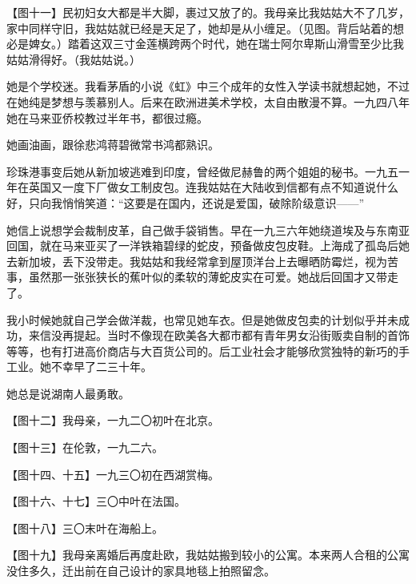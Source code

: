 \par 【图十一】民初妇女大都是半大脚，裹过又放了的。我母亲比我姑姑大不了几岁，家中同样守旧，我姑姑就已经是天足了，她却是从小缠足。（见图。背后站着的想必是婢女。）踏着这双三寸金莲横跨两个时代，她在瑞士阿尔卑斯山滑雪至少比我姑姑滑得好。（我姑姑说。）
\par 她是个学校迷。我看茅盾的小说《虹》中三个成年的女性入学读书就想起她，不过在她纯是梦想与羡慕别人。后来在欧洲进美术学校，太自由散漫不算。一九四八年她在马来亚侨校教过半年书，都很过瘾。
\par 她画油画，跟徐悲鸿蒋碧微常书鸿都熟识。
\par 珍珠港事变后她从新加坡逃难到印度，曾经做尼赫鲁的两个姐姐的秘书。一九五一年在英国又一度下厂做女工制皮包。连我姑姑在大陆收到信都有点不知道说什么好，只向我悄悄笑道：“这要是在国内，还说是爱国，破除阶级意识——”
\par 她信上说想学会裁制皮革，自己做手袋销售。早在一九三六年她绕道埃及与东南亚回国，就在马来亚买了一洋铁箱碧绿的蛇皮，预备做皮包皮鞋。上海成了孤岛后她去新加坡，丢下没带走。我姑姑和我经常拿到屋顶洋台上去曝晒防霉烂，视为苦事，虽然那一张张狭长的蕉叶似的柔软的薄蛇皮实在可爱。她战后回国才又带走了。
\par 我小时候她就自己学会做洋裁，也常见她车衣。但是她做皮包卖的计划似乎并未成功，来信没再提起。当时不像现在欧美各大都市都有青年男女沿街贩卖自制的首饰等等，也有打进高价商店与大百货公司的。后工业社会才能够欣赏独特的新巧的手工业。她不幸早了二三十年。
\par 她总是说湖南人最勇敢。



\par 【图十二】我母亲，一九二〇初叶在北京。



\par 【图十三】在伦敦，一九二六。



\par 【图十四、十五】一九三〇初在西湖赏梅。




\par 【图十六、十七】三〇中叶在法国。





\par 【图十八】三〇末叶在海船上。



\par 【图十九】我母亲离婚后再度赴欧，我姑姑搬到较小的公寓。本来两人合租的公寓没住多久，迁出前在自己设计的家具地毯上拍照留念。



